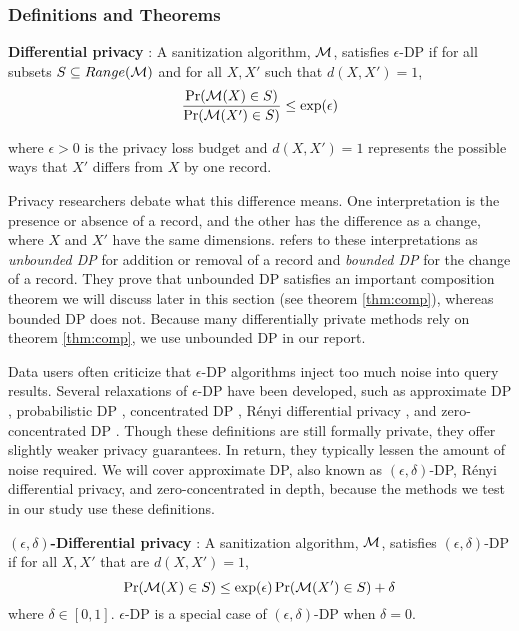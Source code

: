 \subsubsection{Definitions and Theorems}\label{subsec:def}
\begin{defn}\label{def:dp} \textbf{Differential privacy} \citep{dwork2006calibrating}:
A sanitization algorithm, $\mathcal{M}$, satisfies $\epsilon$-DP if for all subsets $S\subseteq Range(\mathcal{M})$ and for all $X,X'$ such that $d(X,X')=1$, 
    \begin{equation}\label{eqn:dp}
        \frac{\Pr(\mathcal{M}( X) \in S)}{ \Pr(\mathcal{M}( X')\in S)}\le \exp(\epsilon)
    \end{equation}
\end{defn}
\noindent where $\epsilon>0$ is the privacy loss budget and $d(X,X')=1$ represents the possible ways that $X'$ differs from $X$ by one record.

Privacy researchers debate what this difference means. One interpretation is the presence or absence of a record, and the other has the difference as a change, where $X$ and $X'$ have the same dimensions. \citet{li2016differential} refers to these interpretations as \textit{unbounded DP} for addition or removal of a record and \textit{bounded DP} for the change of a record. They prove that unbounded DP satisfies an important composition theorem we will discuss later in this section (see theorem \ref{thm:comp}), whereas bounded DP does not. Because many differentially private methods rely on theorem \ref{thm:comp}, we use unbounded DP in our report.

Data users often criticize that $\epsilon$-DP algorithms inject too much noise into query results. Several relaxations of $\epsilon$-DP have been developed, such as approximate DP \citep{dwork2006our}, probabilistic DP \citep{machanavajjhala2008privacy}, concentrated DP \citep{dwork2016concentrated}, R\'enyi differential privacy \citep{mironov2017renyi}, and zero-concentrated DP \citep{bun2016concentrated}. Though these definitions are still formally private, they offer slightly weaker privacy guarantees. In return, they typically lessen the amount of noise required. We will cover approximate DP, also known as $(\epsilon, \delta)$-DP, R\'enyi differential privacy, and zero-concentrated in depth, because the methods we test in our study use these definitions.

\begin{defn}\label{def:adp} \textbf{$(\epsilon, \delta)$-Differential privacy} \citep{dwork2006our}:
A sanitization algorithm, $\mathcal{M}$, satisfies $(\epsilon, \delta)$-DP if for all $X, X'$ that are $d(X,X')=1$,
    \begin{equation}\label{eqn:adp}
        \Pr(\mathcal{M}( X) \in S)\le \exp(\epsilon) \Pr(\mathcal{M}( X')\in S) + \delta
    \end{equation}
    where $\delta\in [0,1]$. $\epsilon$-DP is a special case of $(\epsilon, \delta)$-DP when $\delta=0$.
\end{defn}


